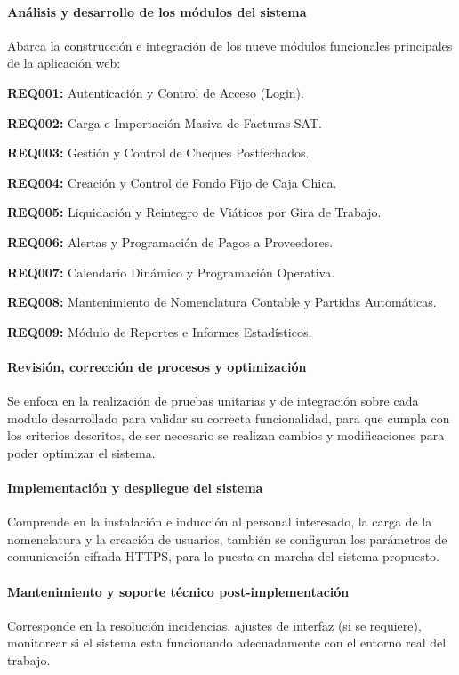 \paragraph{Análisis y desarrollo de los módulos del sistema}
Abarca la construcción e integración de los nueve módulos funcionales principales de la aplicación web:

\textbf{REQ001:} Autenticación y Control de Acceso (Login).

\textbf{REQ002:} Carga e Importación Masiva de Facturas SAT.

\textbf{REQ003:} Gestión y Control de Cheques Postfechados.

\textbf{REQ004:} Creación y Control de Fondo Fijo de Caja Chica.

\textbf{REQ005:} Liquidación y Reintegro de Viáticos por Gira de Trabajo.

\textbf{REQ006:} Alertas y Programación de Pagos a Proveedores.

\textbf{REQ007:} Calendario Dinámico y Programación Operativa.

\textbf{REQ008:} Mantenimiento de Nomenclatura Contable y Partidas Automáticas.

\textbf{REQ009:} Módulo de Reportes e Informes Estadísticos.


\paragraph{Revisión, corrección de procesos y optimización}
Se enfoca en la realización de pruebas unitarias y de integración sobre cada modulo desarrollado para validar su correcta funcionalidad, para que cumpla con los criterios descritos, de ser necesario se realizan cambios y modificaciones para poder optimizar el sistema.

\paragraph{Implementación y despliegue del sistema}
Comprende en la instalación e inducción al personal interesado, la carga de la nomenclatura y la creación de usuarios, también se configuran los parámetros de comunicación cifrada HTTPS, para la puesta en marcha del sistema propuesto. 

\paragraph{Mantenimiento y soporte técnico post-implementación}
Corresponde en la resolución incidencias, ajustes de interfaz (si se requiere), monitorear si el sistema esta funcionando adecuadamente con el entorno real del trabajo.

